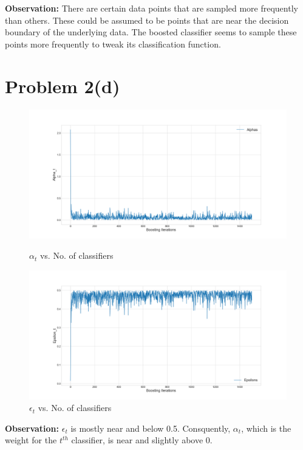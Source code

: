 \documentclass[openany,11pt]{homework}
\begin{document}
\textbf{Observation:} There are certain data points that are sampled more frequently than others. These could be assumed to be points that are near the decision boundary of the underlying data. The boosted classifier seems to sample these points more frequently to tweak its classification function.

\section*{Problem 2(d)}
\begin{figure}[!h]
	\centering
	\includegraphics[width = \textwidth]{Homework_3_export/2da.png}
	\caption{$\alpha_t$ vs. No. of classifiers}
	\centering
	\includegraphics[width = \textwidth]{Homework_3_export/2de.png}
	\caption{$\epsilon_t$ vs. No. of classifiers}
\end{figure}

\textbf{Observation:} $\epsilon_t$ is mostly near and below 0.5. Consquently, $\alpha_t$, which is the weight for the $t^{th}$ classifier, is near and slightly above 0.
\end{document}
